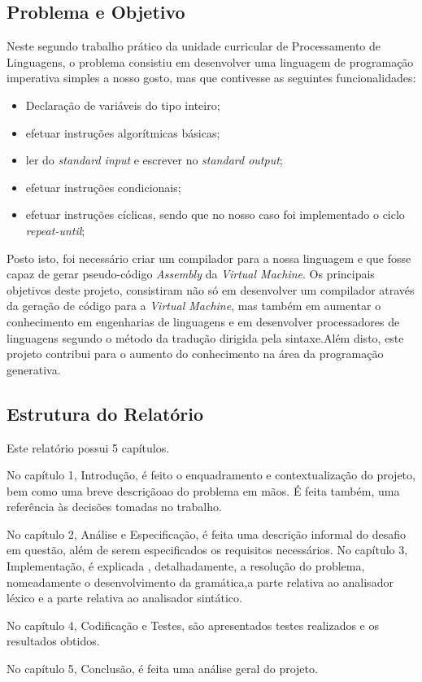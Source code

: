 \documentclass[11pt,a4paper]{report}
\begin{document}
\vspace{3ex}
 
 
\subsection{Problema e Objetivo}
Neste segundo trabalho prático da unidade curricular de Processamento de Linguagens, o problema consistiu em desenvolver uma linguagem de programação imperativa simples a nosso gosto, mas que contivesse as seguintes funcionalidades:
\begin{itemize}
	\item Declaração de variáveis do tipo inteiro;
	\item efetuar instruções algorítmicas básicas;
	\item ler do \textit{standard input} e escrever no \textit{standard output};
	\item efetuar instruções condicionais;
	\item efetuar instruções cíclicas, sendo que no nosso caso foi implementado o ciclo \textit{repeat-until};
	\end{itemize}
Posto isto, foi necessário criar um compilador para a nossa linguagem e  que fosse capaz de gerar pseudo-código \textit{Assembly} da \textit{Virtual Machine}.
Os principais objetivos deste projeto, consistiram não só em desenvolver um compilador através da geração de código para a \textit{Virtual Machine}, mas também em aumentar o conhecimento em engenharias de linguagens e em desenvolver processadores de linguagens segundo o método da tradução dirigida pela sintaxe.Além disto, este projeto contribui para o aumento do conhecimento na área da programação generativa.\par 
\vspace{3ex}

\subsection{Estrutura do Relatório}
Este relatório possui 5 capítulos.\par
No capítulo 1, Introdução, é feito o enquadramento e contextualização do projeto, bem como uma breve descriçãoao do problema em mãos. É feita também, uma referência às decisões tomadas no trabalho.\par
No capítulo 2, Análise e Especificação, é feita uma descrição informal do desafio em questão, além de serem especificados os requisitos necessários.
No capítulo 3, Implementação, é explicada , detalhadamente, a resolução do problema, nomeadamente o desenvolvimento da gramática,a parte relativa ao analisador léxico e a parte relativa ao analisador sintático.\par
No capítulo 4, Codificação e Testes, são apresentados testes realizados e os resultados obtidos.\par
No capítulo 5, Conclusão, é feita uma análise geral do projeto.
\end{document}
